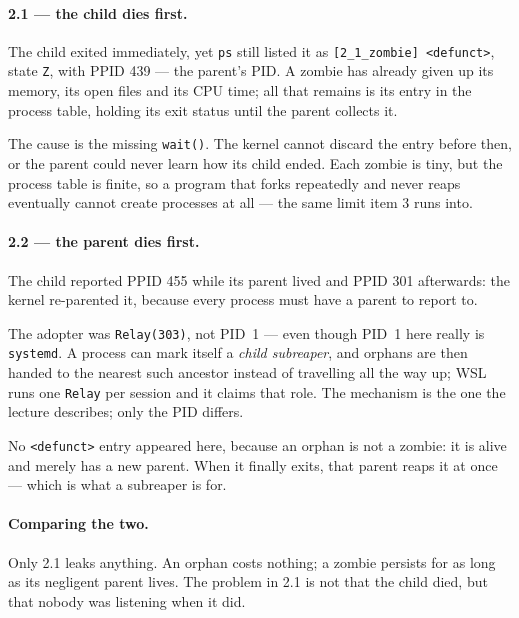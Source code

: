 
\paragraph{2.1 --- the child dies first.}
The child exited immediately, yet \texttt{ps} still listed it as
\texttt{[2\_1\_zombie] <defunct>}, state \texttt{Z}, with PPID 439 --- the
parent's PID. A zombie has already given up its memory, its open files and its
CPU time; all that remains is its entry in the process table, holding its exit
status until the parent collects it.

The cause is the missing \texttt{wait()}. The kernel cannot discard the entry
before then, or the parent could never learn how its child ended. Each zombie is
tiny, but the process table is finite, so a program that forks repeatedly and
never reaps eventually cannot create processes at all --- the same limit item 3
runs into.

\paragraph{2.2 --- the parent dies first.}
The child reported PPID 455 while its parent lived and PPID 301 afterwards: the
kernel re-parented it, because every process must have a parent to report to.

The adopter was \texttt{Relay(303)}, not PID~1 --- even though PID~1 here really
is \texttt{systemd}. A process can mark itself a \emph{child subreaper}, and
orphans are then handed to the nearest such ancestor instead of travelling all
the way up; WSL runs one \texttt{Relay} per session and it claims that role. The
mechanism is the one the lecture describes; only the PID differs.

No \texttt{<defunct>} entry appeared here, because an orphan is not a zombie: it
is alive and merely has a new parent. When it finally exits, that parent reaps it
at once --- which is what a subreaper is for.

\paragraph{Comparing the two.}
Only 2.1 leaks anything. An orphan costs nothing; a zombie persists for as long
as its negligent parent lives. The problem in 2.1 is not that the child died, but
that nobody was listening when it did.
